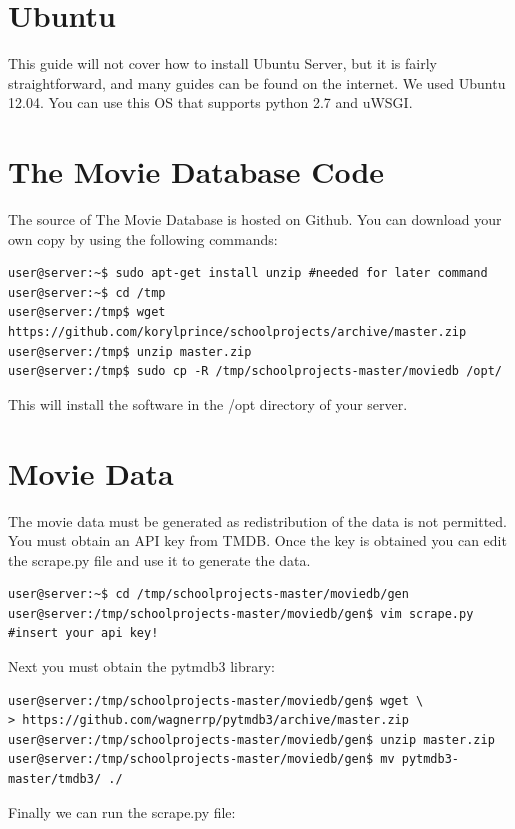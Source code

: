 \documentclass[10pt,a4paper]{scrreprt}
\begin{document}
\section{Ubuntu}
This guide will not cover how to install Ubuntu Server, but it is fairly straightforward, and many guides can be found on the internet. We used Ubuntu 12.04. You can use this OS that supports python 2.7 and uWSGI.

\section{The Movie Database Code}
The source of The Movie Database is hosted on Github. You can download your own copy by using the following commands:

\begin{verbatim}
user@server:~$ sudo apt-get install unzip #needed for later command
user@server:~$ cd /tmp
user@server:/tmp$ wget https://github.com/korylprince/schoolprojects/archive/master.zip
user@server:/tmp$ unzip master.zip
user@server:/tmp$ sudo cp -R /tmp/schoolprojects-master/moviedb /opt/
\end{verbatim}

This will install the software in the /opt directory of your server.

\section{Movie Data}
The movie data must be generated as redistribution of the data is not permitted. You must obtain an API key from TMDB. Once the key is obtained you can edit the scrape.py file and use it to generate the data.

\begin{verbatim}
user@server:~$ cd /tmp/schoolprojects-master/moviedb/gen
user@server:/tmp/schoolprojects-master/moviedb/gen$ vim scrape.py #insert your api key!
\end{verbatim}

Next you must obtain the pytmdb3 library:

\begin{verbatim}
user@server:/tmp/schoolprojects-master/moviedb/gen$ wget \
> https://github.com/wagnerrp/pytmdb3/archive/master.zip
user@server:/tmp/schoolprojects-master/moviedb/gen$ unzip master.zip
user@server:/tmp/schoolprojects-master/moviedb/gen$ mv pytmdb3-master/tmdb3/ ./
\end{verbatim}

Finally we can run the scrape.py file:
\end{document}
